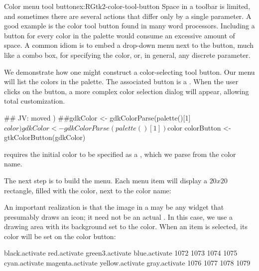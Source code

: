 \begin{example}{Color menu tool button}{ex:RGtk2-color-tool-button}
Space in a toolbar is limited, and sometimes there are several actions
that differ only by a single parameter. A good example is the color
tool button found in many word processors. Including a button for
every color in the palette would consume an excessive amount of
space. A common idiom is to embed a drop-down menu next to the button,
much like a combo box, for specifying the color, or, in general, any
discrete parameter.

We demonstrate how one might construct a color-selecting tool
button. Our menu will list the colors in the \R\/ palette. The
associated button is a . When the user
clicks on the button, a more complex color selection dialog will
appear, allowing total customization.
\begin{Schunk}
\begin{Sinput}
 ## JV: moved )
 ##gdkColor <- gdkColorParse(palette()[1]$color)
 gdkColor <- gdkColorParse(palette()[1])$color
 colorButton <- gtkColorButton(gdkColor)
\end{Sinput}
\end{Schunk}
% 
 requires the initial color to be specified
as a , which we parse from the \R\/ color name.

The next step is to build the menu. Each menu item will display a
$20x20$ rectangle, filled with the color, next to the color name:
\begin{Schunk}
\end{Schunk}
%
An important realization is that the image in a
 may be any widget that presumably draws an
icon; it need not be an actual . In this case, we use
a drawing area with its background set to the color.  When an item is
selected, its color will be set on the color button:
\begin{Schunk}
\begin{Soutput}
  black.activate     red.activate  green3.activate    blue.activate 
            1072             1073             1074             1075 
   cyan.activate magenta.activate  yellow.activate    gray.activate 
            1076             1077             1078             1079 
\end{Soutput}
\end{Schunk}


\end{example}
